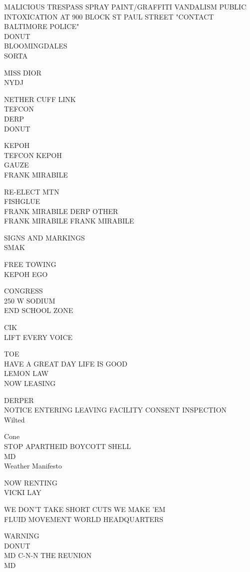 \documentclass[10pt,letterpaper]{article}
\begin{document}
MALICIOUS TRESPASS SPRAY PAINT/GRAFFITI VANDALISM PUBLIC INTOXICATION AT 900 BLOCK ST PAUL STREET "CONTACT BALTIMORE POLICE"\\
DONUT\\
BLOOMINGDALES\\
SORTA

MISS DIOR\\
NYDJ

NETHER CUFF LINK\\
TEFCON\\
DERP\\
DONUT

KEPOH\\
TEFCON KEPOH\\
GAUZE\\
FRANK MIRABILE

RE{-}ELECT MTN\\
FISHGLUE\\
FRANK MIRABILE DERP OTHER\\
FRANK MIRABILE FRANK MIRABILE

SIGNS AND MARKINGS\\
SMAK

FREE TOWING\\
KEPOH EGO

CONGRESS\\
250 W SODIUM\\
END SCHOOL ZONE

CIK\\
LIFT EVERY VOICE

TOE\\
HAVE A GREAT DAY LIFE IS GOOD\\
LEMON LAW\\
NOW LEASING

DERPER\\
NOTICE ENTERING LEAVING FACILITY CONSENT INSPECTION\\
Wilted

Cone\\
STOP APARTHEID BOYCOTT SHELL\\
MD\\
Weather Manifesto

NOW RENTING\\
VICKI LAY

WE DON'T TAKE SHORT CUTS WE MAKE 'EM\\
FLUID MOVEMENT WORLD HEADQUARTERS

WARNING\\
DONUT\\
MD C{-}N{-}N THE REUNION\\
MD
\end{document}
